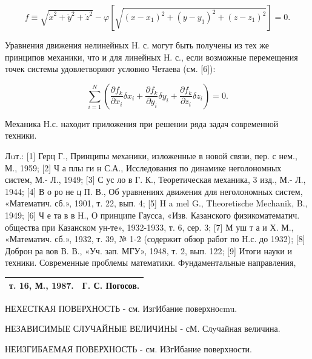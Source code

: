 \documentclass[10pt]{article}
\begin{document}
\[

f \equiv \sqrt{\dot{x}^{2}+\dot{y}^{2}+\dot{z}^{2}}-\varphi\left[\sqrt{\left(x-x_{1}\right)^{2}+\left(y-y_{1}\right)^{2}+\left(z-z_{1}\right)^{2}}\right]=0 .

\]



Уравнения движения нелинейных Н. с. могут быть получены из тех же принципов механики, что и для линейных Н. с., если возможные перемещения точек системы удовлетворяют условию Четаева (см. [6]):



\[

\sum_{i=1}^{N}\left(\frac{\partial f_{k}}{\partial \dot{x}_{i}} \delta x_{i}+\frac{\partial f_{k}}{\partial \dot{y}_{i}} \delta y_{i}+\frac{\partial f_{k}}{\partial \dot{z}_{i}} \delta z_{i}\right)=0 .

\]



Механика Н.с. находит приложения при решении ряда задач современной техники.



Лuт.: [1] Герц Г., Принципы механики, изложенные в новой связи, пер. с нем., М., 1959; [2] Ч а плы ги н С.А., Исследования по динамике неголономных систем, М.- Л., 1949; [3] С ус ло в Г. К., Теоретическая механика, 3 изд., М.- Л., 1944; [4] В о ро не ц П. В., Об уравнениях движения для неголономных систем, «Математич. сб.», 1901, т. 22, вып. 4; [5] H a mel G., Theoretische Mechanik, B., 1949; [6] Ч е та в в Н., О принципе Гаусса, «Изв. Казанского физикоматематич. общества при Казанском ун-те», 1932-1933, т. 6, сер. 3; [7] М уш т а и Х. М., «Математич. сб.», 1932, т. 39, № 1-2 (содержит обзор работ по Н.с. до 1932); [8] Доброн ра вов В. В., «Уч. зап. МГУ», 1948, т. 2, вып. 122; [9] Итоги науки и техники. Современные проблемы математики. Фундаментальные направления, \begin{tabular}{ll}

т. 16, М., 1987. & Г. С. Погосов. \\

\hline

\end{tabular} НЕХЕСТКАЯ ПОВЕРХНОСТЬ - см. ИзгИбание поверхноcmu.



НЕЗАВИСИМЫЕ СЛУЧАЙНЫЕ ВЕЛИЧИНЫ - сМ. Слyчайная величина.



НЕИЗГИБАЕМАЯ ПОВЕРХНОСТЬ - см. ИЗгИбание поверхности.
\end{document}
